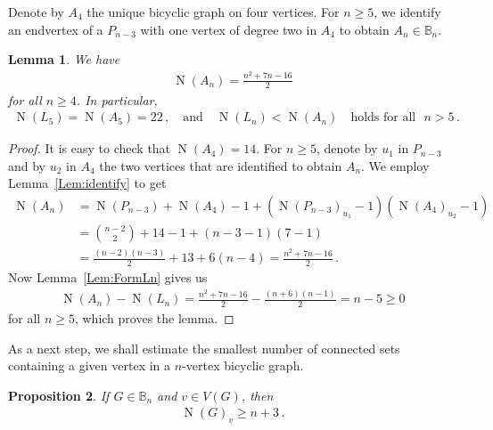 \documentclass[a4paper,12pt]{amsart}
\newtheorem{lemma}{Lemma}
\newtheorem{proposition}[lemma]{Proposition}
\theoremstyle{remark}
\DeclareMathOperator{\N}{N}
\begin{document}
\medskip
Denote by $A_4$ the unique bicyclic graph on four vertices. For $n\geq 5$, we identify an endvertex of a $P_{n-3}$ with one vertex of degree two in $A_4$ to obtain $A_n \in \mathbb{B}_n$.

\begin{lemma}
We have
\begin{align*}
\N(A_n)=\frac{n^2+7n-16}{2}
\end{align*}
for all $n\geq 4$. In particular,
\begin{align*}
\N(L_5)=\N(A_5)=22\,, \quad \text{and} \quad \N(L_n)< \N(A_n) \quad \text{holds for all}~~~ n > 5\,.
\end{align*}

\end{lemma}
\begin{proof}
It is easy to check that $\N(A_4)=14$. For $n\geq 5$, denote by $u_1$ in $P_{n-3}$ and by $u_2$ in $A_4$ the two vertices that are identified to obtain $A_n$. We employ Lemma~\ref{Lem:identify} to get
\begin{align*}
\N(A_n)&=\N(P_{n-3})+\N(A_4) -1 + (\N(P_{n-3})_{u_1} -1 )(\N(A_4)_{u_2} -1 )\\
&=\binom{n-2}{2}+14-1+(n-3-1)(7-1)\\
&=\frac{(n-2)(n-3)}{2}+13+6(n-4)=\frac{n^2+7n-16}{2}\,.
\end{align*}
Now Lemma~\ref{Lem:FormLn} gives us
\begin{align*}
\N(A_n)-\N(L_n)=  \frac{n^2+7n-16}{2} -  \frac{(n+6)(n-1)}{2} = n-5 \geq 0
\end{align*}
for all $n\geq 5$, which proves the lemma.
\end{proof} 

\medskip
As a next step, we shall estimate the smallest number of connected sets containing a given vertex in a $n$-vertex bicyclic graph.

\begin{proposition}\label{Prop:nplus3}
If $G\in \mathbb{B}_n$ and $v\in V(G)$, then 
\begin{align*}
\N(G)_v \geq n+3\,.
\end{align*}
\end{proposition}
\end{document}
